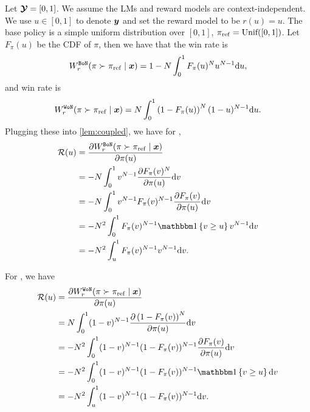 Let ${\bm{\mathcal{Y}}} = [0,1]$. We assume the LMs and reward models are context-independent. We use $u \in [0, 1]$ to denote ${\bm{y}}$ and set the reward model to be $r(u) = u$. The base policy is a simple uniform distribution over $[0, 1]$, ${\pi_{\rm ref}} = \text{Unif}([0, 1])$. Let $F_{\pi}(u)$ be the CDF of $\pi$, then we have that the \bofn win rate is
\[
    W^{\texttt{BoN}}_r(\pi \succ {\pi_{\rm ref}} \mid {\bm{x}}) = 1 - N \int_{0}^1 F_{\pi}(u)^N u^{N-1} {\rm d} u,
    \]
and \wofn win rate is
    \[
    W^{\texttt{WoN}}_r(\pi \succ {\pi_{\rm ref}} \mid {\bm{x}}) =  N \int_{0}^1 \left(1 - F_{\pi}(u) \right)^N (1-u)^{N-1} {\rm d} u.
    \]
Plugging these into \cref{lem:coupled}, we have for \bofn, 
\begin{align*}
    \tr(u) & = \frac{\partial W^{\bofn}_r(\pi \succ \bp \mid \bx)}{\partial \pi(u)} \\
    & =  - N \int_{0}^1  v^{N-1} \frac{\partial F_{\pi}(v)^N}{\partial \pi(u)}\dd v \\
     & = - N \int_{0}^1  v^{N-1} F_{\pi}(v)^{N-1}\frac{\partial F_{\pi}(v)}{\partial \pi(u)}\dd v \\
    & = -N^2 \int_0^1 F_{\pi}(v)^{N-1} \idc{v \ge u} v^{N-1} \dd v \\
    & = -N^2 \int_u^1 F_{\pi}(v)^{N-1} v^{N-1} \dd v.
\end{align*}

For \wofn, we have
\begin{align*}
    \tr(u) & = \frac{\partial W^{\wofn}_r(\pi \succ \bp \mid \bx)}{\partial \pi(u)} \\
    & =  N \int_{0}^1  (1 - v)^{N-1} \frac{\partial \Paren{1 - F_{\pi}(v)}^N}{\partial \pi(u)}\dd v \\
     & = - N^2 \int_{0}^1  (1-v)^{N-1} (1 - F_{\pi}(v))^{N-1}\frac{\partial F_{\pi}(v)}{\partial \pi(u)}\dd v \\
    & = -N^2 \int_0^1 (1-v)^{N-1} (1 - F_{\pi}(v))^{N-1} \idc{v \ge u}\dd v \\
    & = -N^2 \int_u^1 (1-v)^{N-1} (1 - F_{\pi}(v))^{N-1} \dd v.
\end{align*}